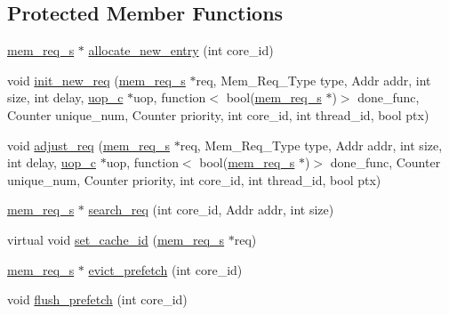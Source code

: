 \subsection*{Protected Member Functions}
\begin{DoxyCompactItemize}
\item 
\hyperlink{structmem__req__s}{mem\_\-req\_\-s} $\ast$ \hyperlink{classmemory__c_a57f0cd07a859cf117bf195cddadfebb3}{allocate\_\-new\_\-entry} (int core\_\-id)
\item 
void \hyperlink{classmemory__c_aea4d542da14dfc9d59d108e2cae665bb}{init\_\-new\_\-req} (\hyperlink{structmem__req__s}{mem\_\-req\_\-s} $\ast$req, Mem\_\-Req\_\-Type type, Addr addr, int size, int delay, \hyperlink{classuop__c}{uop\_\-c} $\ast$uop, function$<$ bool(\hyperlink{structmem__req__s}{mem\_\-req\_\-s} $\ast$)$>$ done\_\-func, Counter unique\_\-num, Counter priority, int core\_\-id, int thread\_\-id, bool ptx)
\item 
void \hyperlink{classmemory__c_ac3a3a9028dc3577a577c959e5256b38d}{adjust\_\-req} (\hyperlink{structmem__req__s}{mem\_\-req\_\-s} $\ast$req, Mem\_\-Req\_\-Type type, Addr addr, int size, int delay, \hyperlink{classuop__c}{uop\_\-c} $\ast$uop, function$<$ bool(\hyperlink{structmem__req__s}{mem\_\-req\_\-s} $\ast$)$>$ done\_\-func, Counter unique\_\-num, Counter priority, int core\_\-id, int thread\_\-id, bool ptx)
\item 
\hyperlink{structmem__req__s}{mem\_\-req\_\-s} $\ast$ \hyperlink{classmemory__c_aebf82c8ad5dbd9bbda629f0677be0c31}{search\_\-req} (int core\_\-id, Addr addr, int size)
\item 
virtual void \hyperlink{classmemory__c_aa15a04b3d5bb8e6ab0b7274b9c50a319}{set\_\-cache\_\-id} (\hyperlink{structmem__req__s}{mem\_\-req\_\-s} $\ast$req)
\item 
\hyperlink{structmem__req__s}{mem\_\-req\_\-s} $\ast$ \hyperlink{classmemory__c_aa2d744d2895b71290ec9475c6faa5640}{evict\_\-prefetch} (int core\_\-id)
\item 
void \hyperlink{classmemory__c_a5dc85d0815f9ebbcf69f4f85845dcb57}{flush\_\-prefetch} (int core\_\-id)
\end{DoxyCompactItemize}
